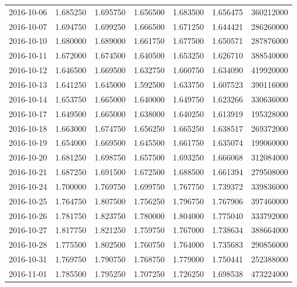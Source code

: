 \begin{tabular}{lrrrrrr}
2016-10-06 &    1.685250 &    1.695750 &    1.656500 &    1.683500 &    1.656475 &   360212000 \\
2016-10-07 &    1.694750 &    1.699250 &    1.666500 &    1.671250 &    1.644421 &   286260000 \\
2016-10-10 &    1.680000 &    1.689000 &    1.661750 &    1.677500 &    1.650571 &   287876000 \\
2016-10-11 &    1.672000 &    1.674500 &    1.640500 &    1.653250 &    1.626710 &   388540000 \\
2016-10-12 &    1.646500 &    1.669500 &    1.632750 &    1.660750 &    1.634090 &   419920000 \\
2016-10-13 &    1.641250 &    1.645000 &    1.592500 &    1.633750 &    1.607523 &   390116000 \\
2016-10-14 &    1.653750 &    1.665000 &    1.640000 &    1.649750 &    1.623266 &   330636000 \\
2016-10-17 &    1.649500 &    1.665000 &    1.638000 &    1.640250 &    1.613919 &   195328000 \\
2016-10-18 &    1.663000 &    1.674750 &    1.656250 &    1.665250 &    1.638517 &   269372000 \\
2016-10-19 &    1.654000 &    1.669500 &    1.645500 &    1.661750 &    1.635074 &   199060000 \\
2016-10-20 &    1.681250 &    1.698750 &    1.657500 &    1.693250 &    1.666068 &   312084000 \\
2016-10-21 &    1.687250 &    1.691500 &    1.672500 &    1.688500 &    1.661394 &   279508000 \\
2016-10-24 &    1.700000 &    1.769750 &    1.699750 &    1.767750 &    1.739372 &   339836000 \\
2016-10-25 &    1.764750 &    1.807500 &    1.756250 &    1.796750 &    1.767906 &   397460000 \\
2016-10-26 &    1.781750 &    1.823750 &    1.780000 &    1.804000 &    1.775040 &   333792000 \\
2016-10-27 &    1.817750 &    1.821250 &    1.759750 &    1.767000 &    1.738634 &   388664000 \\
2016-10-28 &    1.775500 &    1.802500 &    1.760750 &    1.764000 &    1.735683 &   290856000 \\
2016-10-31 &    1.769750 &    1.790750 &    1.768750 &    1.779000 &    1.750441 &   252388000 \\
2016-11-01 &    1.785500 &    1.795250 &    1.707250 &    1.726250 &    1.698538 &   473224000 \\

\end{tabular}
